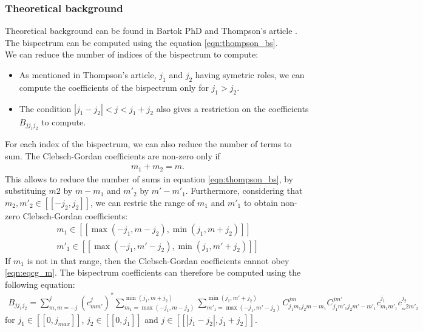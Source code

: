 \documentclass[12pt]{article}
\begin{document}
      \subsubsection{Theoretical background}

        Theoretical background can be found in Bartok PhD \cite{Bartok_01} and Thompson's article \cite{Thompson_01}. The bispectrum can be computed using the equation \ref{eqn:thompson_bs}. \\
We can reduce the number of indices of the bispectrum to compute: 
\begin{itemize}
\item As mentioned in Thompson's article, $j_1$ and $j_2$ having symetric roles, we can compute the coefficients of the bispectrum only for $j_1>j_2$. 
\item The condition $|j_1-j_2|<j<j_1+j_2$ also gives a restriction on the coefficients $B_{j j_1 j_2}$ to compute.\\
\end{itemize}


For each index of the bispectrum, we can also reduce the number of terms to sum. The Clebsch-Gordan coefficients are non-zero only if 
\begin{eqnarray} \label{eqn:eqcg_m}
m_1+m_2=m. 
\end{eqnarray} 
This allows to reduce the number of sums in equation \ref{eqn:thompson_bs}, by substituing $m2$ by $m-m_1$ and $m'_2$ by $m'-m'_1$. Furthermore, considering that $m_2,m'_2 \in [\![-j_2,j_2]\!]$, we can restric the range of $m_1$ and $m'_1$ to obtain non-zero Clebsch-Gordan coefficients:\\
\begin{eqnarray}
m_1 \in [\![\max(-j_1,m-j_2),\min(j_1,m+j_2)]\!]  \\
m'_1 \in [\![\max(-j_1,m'-j_2),\min(j_1,m'+j_2)]\!] \nonumber
\end{eqnarray}
If $m_1$ is not in that range, then the Clebsch-Gordan coefficients cannot obey \ref{eqn:eqcg_m}. The bispectrum coefficients can therefore be computed using the following equation:
\begin{eqnarray} \label{eqn:bs_eff}
B_{j j_1 j_2}=\sum_{m,m=-j}^j\left(c^j_{m m'}\right)^\ast \sum_{m_1=\max\left(-j_1,m-j_2\right)}^{\min\left(j_1,m+j_2\right)} \sum_{m'_1=\max\left(-j_1,m'-j_2\right)}^{\min\left(j_1,m'+j_2\right)}C^{j m}_{j_1 m_1 j_2 m-m_1} C^{j m'}_{j_1 m'_1 j_2 m'-m'_1} c^{j_1}_{m_1 m'_1} c^{j_2}_{_m2 m'_2}
\end{eqnarray}
for $j_1\in [\![ 0,j_{max}]\!]$, $j_2 \in [\![0,j_1]\!]$ and $j \in [\![|j_1-j_2|,j_1+j_2]\!]$.
\end{document}
